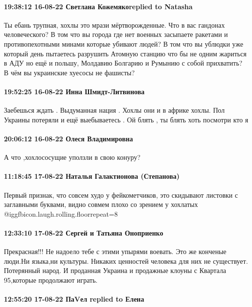 \paragraph{19:38:12 16-08-22 Светлана Кожемякоreplied to Natasha}

Ты ебань трупная, хохлы это мрази мёртворожденные. Что в вас гандонах
человеческого? В том что вы города где нет военных засыпаете ракетами и
противопехотными минами которые убивают людей? В том что вы ублюдки уже который
день пытаетесь разрушить Атомную станцию что бы не одним жариться в АДУ но ещё
и польшу, Молдавию Болгарию и Румынию с собой прихватить? В чём вы украинские
хуесосы не фашисты?

\paragraph{19:52:25 16-08-22 Инна Шмидт-Литвинова}

Заебешься ждать . Выдуманная нация . Хохлы они и в африке хохлы. Пол Украины
потеряли и ещё выебываетесь . Ой блять , ты блять хоть посмотри кто я

\paragraph{20:06:12 16-08-22 Олеся Владимировна}

А что ,хохлососущие уползли в свою конуру?

\paragraph{11:18:45 17-08-22 Наталья Галактионова (Степанова)}

Первый признак, что совсем худо у фейкометчиков, это скидывают листовки с
заглавными буквами, видно совмем плохо со зрением у хохлатых @igg{fbicon.laugh.rolling.floor}{repeat=8} 

\paragraph{12:33:10 17-08-22 Сергей и Татьяна Оноприенко}

Прекрасная!!! Не надоело тебе с этими упырями воевать. Это же конченые люди.Ни
языка,ни культуры. Никаких ценностей человека для них не существует. Потерянный
народ. И проданная Украина и продажные клоуны с Квартала 95,которые продолжают
играть.

\paragraph{12:55:20 17-08-22 ПаVел replied to Елена}

